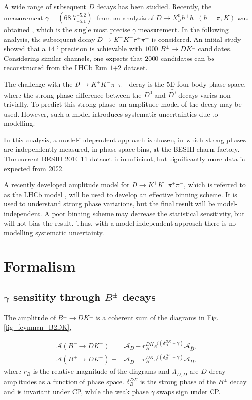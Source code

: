 \documentclass[12pt, a4paper, notitlepage, onecolumn]{article}
\numberwithin{equation}{section}
\begin{document}
A wide range of subsequent $D$ decays has been studied. Recently, the measurement $\gamma = (68.7^{+5.2}_{-5.1})^\circ$ from an analysis of $D\to K_S^0h^+h^-(h = \pi, K)$ was obtained \cite{cite_LHCbGGSZKSpipi}, which is the single most precise $\gamma$ measurement. In the following analysis, the subsequent decay $D\to K^+K^-\pi^+\pi^-$ is considered. An initial study \cite{cite_RademackerWilkinson} showed that a $\SI{14}{\degree}$ precision is achievable with $1000$ $B^\pm\to DK^\pm$ candidates. Considering similar channels, one expects that $2000$ candidates can be reconstructed from the LHCb Run $1$+$2$ dataset.

The challenge with the $D\to K^+K^-\pi^+\pi^-$ decay is the $5$D four-body phase space, where the strong phase difference between the $D^0$ and $\bar{D^0}$ decays varies non-trivially. To predict this strong phase, an amplitude model of the decay may be used. However, such a model introduces systematic uncertainties due to modelling.

In this analysis, a model-independent approach is chosen, in which strong phases are independently measured, in phase space bins, at the BESIII charm factory. The current BESIII 2010-11 dataset is insufficient, but significantly more data is expected from 2022.

A recently developed amplitude model for $D\to K^+K^-\pi^+\pi^-$, which is referred to as the LHCb model \cite{cite_AmplitudeModel}, will be used to develop an effective binning scheme. It is used to understand strong phase variations, but the final result will be model-independent. A poor binning scheme may decrease the statistical sensitivity, but will not bias the result. Thus, with a model-independent approach there is no modelling systematic uncertainty.

\section{Formalism}
\subsection{\texorpdfstring{$\gamma$}{gamma} sensitity through \texorpdfstring{$B^\pm$}{B} decays}
The amplitude of $B^\pm\to DK^\pm$ is a coherent sum of the diagrams in Fig. \ref{fig_feynman_B2DK},

\begin{align}
  \mathcal{A}(B^-\to DK^-) =& \mathcal{A}_D + r_B^{DK}e^{i(\delta_B^{DK} - \gamma)}\mathcal{A}_{\bar{D}}, \label{eq_Bm2DKm} \\
  \mathcal{A}(B^+\to DK^+) =& \mathcal{A}_{\bar{D}} + r_B^{DK}e^{i(\delta_B^{DK} + \gamma)}\mathcal{A}_D, \label{eq_Bp2DKp}
\end{align}
where $r_B$ is the relative magnitude of the diagrams and $A_{D, \bar{D}}$ are $D$ decay amplitudes as a function of phase space. $\delta_B^{DK}$ is the strong phase of the $B^\pm$ decay and is invariant under CP, while the weak phase $\gamma$ swaps sign under CP.
\end{document}
